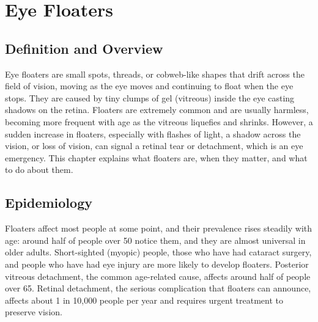 \chapter{Eye Floaters}

\section*{Definition and Overview}
Eye floaters are small spots, threads, or cobweb-like shapes that drift across the field of vision, moving as the eye moves and continuing to float when the eye stops. They are caused by tiny clumps of gel (vitreous) inside the eye casting shadows on the retina. Floaters are extremely common and are usually harmless, becoming more frequent with age as the vitreous liquefies and shrinks. However, a sudden increase in floaters, especially with flashes of light, a shadow across the vision, or loss of vision, can signal a retinal tear or detachment, which is an eye emergency. This chapter explains what floaters are, when they matter, and what to do about them.

\section*{Epidemiology}
Floaters affect most people at some point, and their prevalence rises steadily with age: around half of people over 50 notice them, and they are almost universal in older adults. Short-sighted (myopic) people, those who have had cataract surgery, and people who have had eye injury are more likely to develop floaters. Posterior vitreous detachment, the common age-related cause, affects around half of people over 65. Retinal detachment, the serious complication that floaters can announce, affects about 1 in 10,000 people per year and requires urgent treatment to preserve vision.

